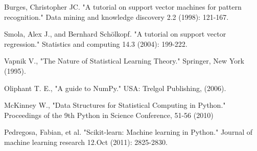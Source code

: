 \documentclass[12pt]{report}
\begin{document}
%
%
\begin{thebibliography}{00}

Burges, Christopher JC. "A tutorial on support vector machines for pattern recognition." Data mining and knowledge discovery 2.2 (1998): 121-167.

Smola, Alex J., and Bernhard Schölkopf. "A tutorial on support vector regression." Statistics and computing 14.3 (2004): 199-222.

Vapnik V., "The Nature of Statistical Learning Theory." Springer, New York (1995).

Oliphant T. E., "A guide to NumPy." USA: Trelgol Publishing, (2006).

McKinney W., "Data Structures for Statistical Computing in Python." Proceedings of the 9th Python in Science Conference, 51-56 (2010)

Pedregosa, Fabian, et al. "Scikit-learn: Machine learning in Python." Journal of machine learning research 12.Oct (2011): 2825-2830.

%
\end{thebibliography}
% 
\end{document}
